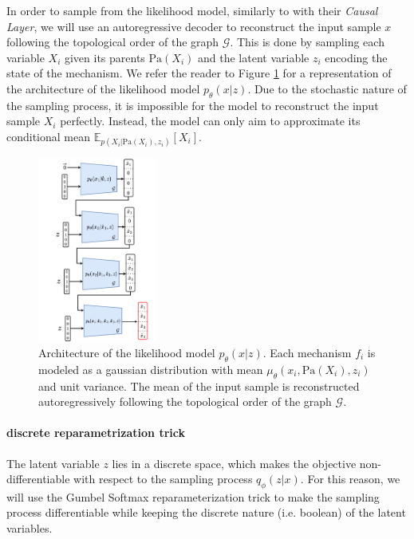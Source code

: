\documentclass{article}
\begin{document}
In order to sample from the likelihood model, similarly to \citet{CausalVAE}
with their \textit{Causal Layer}, we will use an autoregressive decoder to
reconstruct the input sample $x$ following the topological order of the graph
$\mathcal{G}$. This is done by sampling each variable $X_i$ given its parents
$\text{Pa}(X_i)$ and the latent variable $z_i$ encoding the state of the
mechanism. We refer the reader to Figure \ref{fig:architecture_decoder} for a
representation of the architecture of the likelihood model $p_\theta(x | z)$.
Due to the stochastic nature of the sampling process, it is impossible for the
model to reconstruct the input sample $X_i$ perfectly. Instead, the model can
only aim to approximate its conditional mean
$\mathbb{E}_{p(X_i|\text{Pa}(X_i),z_i)}[X_i]$.
\begin{figure}
    \centering
    \includegraphics[width=0.35\textwidth]{images/architecture_decoder.pdf}
    \caption{Architecture of the likelihood model $p_\theta(x | z)$. Each mechanism $f_i$ is modeled as a gaussian distribution with mean $\mu_\theta(x_i, \text{Pa}(X_i), z_i)$ and unit variance. The mean of the input sample is reconstructed autoregressively following the topological order of the graph $\mathcal{G}$.}
    \label{fig:architecture_decoder}
\end{figure}
\paragraph{discrete reparametrization trick}
The latent variable $z$ lies in a discrete space, which makes the objective
non-differentiable with respect to the sampling process $q_\phi(z | x)$. For
this reason, we will use the Gumbel Softmax reparameterization trick
\citep{jang2017categoricalreparameterizationgumbelsoftmax} to make the sampling
process differentiable while keeping the discrete nature (i.e. boolean) of the
latent variables.
\end{document}
